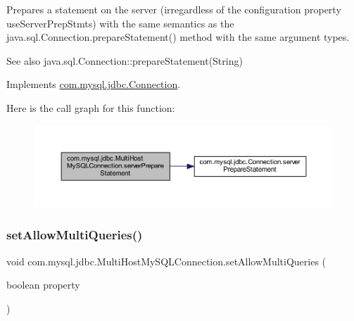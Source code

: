 Prepares a statement on the server (irregardless of the configuration property \textquotesingle{}use\+Server\+Prep\+Stmts\textquotesingle{}) with the same semantics as the java.\+sql.\+Connection.\+prepare\+Statement() method with the same argument types.

\begin{DoxySeeAlso}{See also}
java.\+sql.\+Connection\+::prepare\+Statement(\+String) 
\end{DoxySeeAlso}


Implements \mbox{\hyperlink{interfacecom_1_1mysql_1_1jdbc_1_1_connection_a6e2680bb0a1c38613a4788de1916b596}{com.\+mysql.\+jdbc.\+Connection}}.

Here is the call graph for this function\+:
\nopagebreak
\begin{figure}[H]
\begin{center}
\leavevmode
\includegraphics[width=350pt]{classcom_1_1mysql_1_1jdbc_1_1_multi_host_my_s_q_l_connection_a7a111a6315de5d2c9b08f5e4d4f84fed_cgraph}
\end{center}
\end{figure}
\mbox{\label{classcom_1_1mysql_1_1jdbc_1_1_multi_host_my_s_q_l_connection_a0a2fefd00cc98baf06444ff815a8066d}} 
\subsubsection{\texorpdfstring{set\+Allow\+Multi\+Queries()}{setAllowMultiQueries()}}
{\footnotesize\ttfamily void com.\+mysql.\+jdbc.\+Multi\+Host\+My\+S\+Q\+L\+Connection.\+set\+Allow\+Multi\+Queries (\begin{DoxyParamCaption}\item[{boolean}]{property }\end{DoxyParamCaption})}


